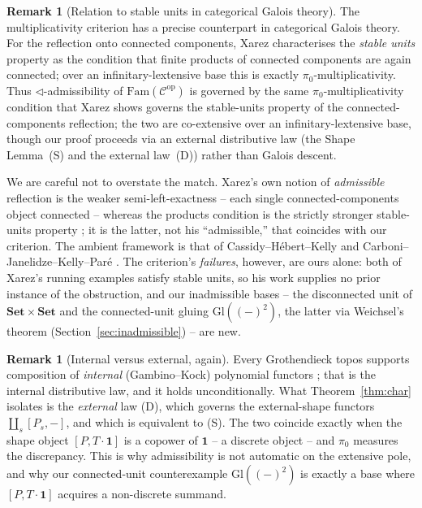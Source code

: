 \documentclass[11pt]{amsart}
\theoremstyle{plain}
\theoremstyle{definition}
\newtheorem{remark}[theorem]{Remark}
\newcommand{\C}{\mathcal{C}}
\newcommand{\Fam}{\mathrm{Fam}}
\newcommand{\Setb}{\mathbf{Set}}
\newcommand{\Gl}{\mathrm{Gl}}
\newcommand{\op}{\mathrm{op}}
\newcommand{\comp}{\mathbin{\triangleleft}}
\newcommand{\one}{\mathbf{1}}
\newcommand{\pizero}{\pi_0}
\begin{document}
\begin{remark}[Relation to stable units in categorical Galois theory]\label{rem:xarez}
The multiplicativity criterion has a precise counterpart in categorical Galois theory. For the
reflection onto connected components, Xarez \cite[Thm.~5.1]{Xarez} characterises the \emph{stable
units} property as the condition that finite products of connected components are again connected;
over an infinitary-lextensive base this is exactly $\pizero$-multiplicativity. Thus
$\comp$-admissibility of $\Fam(\C^{\op})$ is governed by the same $\pizero$-multiplicativity condition
that Xarez shows governs the stable-units property of the connected-components reflection; the two are
co-extensive over an infinitary-lextensive base, though our proof proceeds via an external
distributive law (the Shape Lemma~(S) and the external law~(D)) rather than Galois descent.

We are careful not to overstate the match. Xarez's own notion of \emph{admissible} reflection is the
weaker semi-left-exactness \cite[Thm.~4.1]{Xarez} -- each single connected-components object connected
-- whereas the products condition is the strictly stronger stable-units property
\cite[Thm.~5.1]{Xarez}; it is the latter, not his ``admissible,'' that coincides with our criterion.
The ambient framework is that of Cassidy--H\'ebert--Kelly \cite{CHK} and
Carboni--Janelidze--Kelly--Par\'e \cite{CJKP}. The criterion's \emph{failures}, however, are ours
alone: both of Xarez's running examples satisfy stable units, so his work supplies no prior instance
of the obstruction, and our inadmissible bases -- the disconnected unit of $\Setb\times\Setb$ and the
connected-unit gluing $\Gl((-)^2)$, the latter via Weichsel's theorem
(Section~\ref{sec:inadmissible}) -- are new.
\end{remark}

\begin{remark}[Internal versus external, again]\label{rem:char-internal}
Every Grothendieck topos supports composition of \emph{internal} (Gambino--Kock) polynomial functors
\cite{GambinoKock}; that is the internal distributive law, and it holds unconditionally. What
Theorem~\ref{thm:char} isolates is the \emph{external} law (D), which governs the external-shape
functors $\coprod_s[P_s,-]$, and which is equivalent to (S). The two coincide exactly when the shape
object $[P,T\cdot\one]$ is a copower of $\one$ -- a discrete object -- and $\pizero$ measures the
discrepancy. This is why admissibility is not automatic on the extensive pole, and why our
connected-unit counterexample $\Gl((-)^2)$ is exactly a base where $[P,T\cdot\one]$ acquires a
non-discrete summand.
\end{remark}
\end{document}
